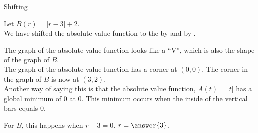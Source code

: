 \documentclass{ximera}
\begin{document}
\begin{example}  Shifting

Let $B(r) = |r-3| + 2$.  \\


We have shifted the absolute value function to the  by  and   by .


\begin{image}
\end{image}

\end{example}


The graph of the absolute value function looks like a ``V'', which is also the shape of the graph of $B$. \\


The graph of the absolute value function has a corner at $(0, 0)$.  The corner in the graph of $B$ is now at $(3, 2)$. \\

Another way of saying this is that the absolute value function, $A(t) = |t|$ has a global minimum of $0$ at $0$.  This minimum occurs when the inside of the vertical bars equals $0$.

For $B$, this happens when $r-3=0$. $r=\answer{3}$.
\end{document}
